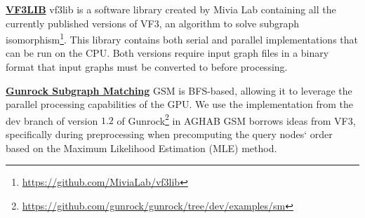     \underline{\textbf{VF3LIB}}
        vf3lib is a software library created by Mivia Lab containing all the currently published versions of VF3, an algorithm to solve subgraph isomorphism\footnote{\url{https://github.com/MiviaLab/vf3lib}}. 
        This library contains both serial and parallel implementations that can be run on the CPU. 
        Both versions require input graph files in a binary format that input graphs must be converted to before processing.

    \underline{\textbf{Gunrock Subgraph Matching}}
        GSM is BFS-based, allowing it to leverage the parallel processing capabilities of the GPU.
        We use the implementation from the dev branch of version $1.2$ of Gunrock\footnote{\url{https://github.com/gunrock/gunrock/tree/dev/examples/sm}} in AGHAB 
        GSM borrows ideas from VF3, specifically during preprocessing when precomputing the query nodes` order based on the Maximum Likelihood Estimation (MLE) method. 
    